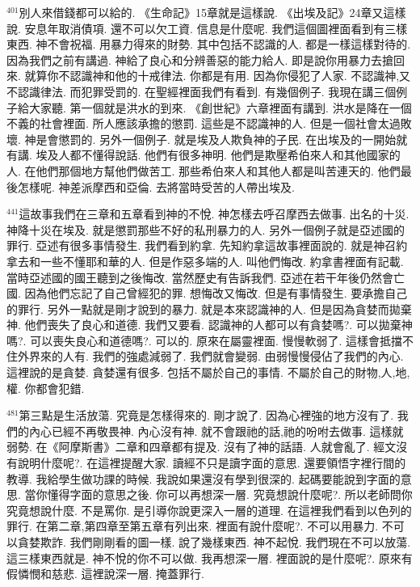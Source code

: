 \documentclass{book}
\begin{document}
$^{401}$別人來借錢都可以給的.
《生命記》15章就是這樣說.
《出埃及記》24章又這樣說.
安息年取消債項.
還不可以欠工資.
信息是什麼呢.
我們這個圖裡面看到有三樣東西.
神不會祝福.
用暴力得來的財勢.
其中包括不認識的人.
都是一樣這樣對待的.
因為我們之前有講過.
神給了良心和分辨善惡的能力給人.
即是說你用暴力去搶回來.
就算你不認識神和他的十戒律法.
你都是有用.
因為你侵犯了人家.
不認識神,又不認識律法.
而犯罪受罰的.
在聖經裡面我們有看到.
有幾個例子.
我現在講三個例子給大家聽.
第一個就是洪水的到來.
《創世紀》六章裡面有講到.
洪水是降在一個不義的社會裡面.
所人應該承擔的懲罰.
這些是不認識神的人.
但是一個社會太過敗壞.
神是會懲罰的.
另外一個例子.
就是埃及人欺負神的子民.
在出埃及的一開始就有講.
埃及人都不懂得說話.
他們有很多神明.
他們是欺壓希伯來人和其他國家的人.
在他們那個地方幫他們做苦工.
那些希伯來人和其他人都是叫苦連天的.
他們最後怎樣呢.
神差派摩西和亞倫.
去將當時受苦的人帶出埃及.

$^{441}$這故事我們在三章和五章看到神的不悅.
神怎樣去呼召摩西去做事.
出名的十災.
神降十災在埃及.
就是懲罰那些不好的私刑暴力的人.
另外一個例子就是亞述國的罪行.
亞述有很多事情發生.
我們看到約拿.
先知約拿這故事裡面說的.
就是神召約拿去和一些不懂耶和華的人.
但是作惡多端的人.
叫他們悔改.
約拿書裡面有記載.
當時亞述國的國王聽到之後悔改.
當然歷史有告訴我們.
亞述在若干年後仍然會亡國.
因為他們忘記了自己曾經犯的罪.
想悔改又悔改.
但是有事情發生.
要承擔自己的罪行.
另外一點就是剛才說到的暴力.
就是本來認識神的人.
但是因為貪婪而拋棄神.
他們喪失了良心和道德.
我們又要看.
認識神的人都可以有貪婪嗎?.
可以拋棄神嗎?.
可以喪失良心和道德嗎?.
可以的.
原來在屬靈裡面.
慢慢軟弱了.
這樣會抵擋不住外界來的人有.
我們的強處減弱了.
我們就會變弱.
由弱慢慢侵佔了我們的內心.
這裡說的是貪婪.
貪婪還有很多.
包括不屬於自己的事情.
不屬於自己的財物,人,地,權.
你都會犯錯.

$^{481}$第三點是生活放蕩.
究竟是怎樣得來的.
剛才說了.
因為心裡強的地方沒有了.
我們的內心已經不再敬畏神.
內心沒有神.
就不會跟祂的話,祂的吩咐去做事.
這樣就弱勢.
在《阿摩斯書》二章和四章都有提及.
沒有了神的話語.
人就會亂了.
經文沒有說明什麼呢?.
在這裡提醒大家.
讀經不只是讀字面的意思.
還要領悟字裡行間的教導.
我給學生做功課的時候.
我說如果還沒有學到很深的.
起碼要能說到字面的意思.
當你懂得字面的意思之後.
你可以再想深一層.
究竟想說什麼呢?.
所以老師問你究竟想說什麼.
不是罵你.
是引導你說更深入一層的道理.
在這裡我們看到以色列的罪行.
在第二章,第四章至第五章有列出來.
裡面有說什麼呢?.
不可以用暴力.
不可以貪婪欺詐.
我們剛剛看的圖一樣.
說了幾樣東西.
神不起悅.
我們現在不可以放蕩.
這三樣東西就是.
神不悅的你不可以做.
我再想深一層.
裡面說的是什麼呢?.
原來有假憐憫和慈悲.
這裡說深一層.
掩蓋罪行.
\end{document}
